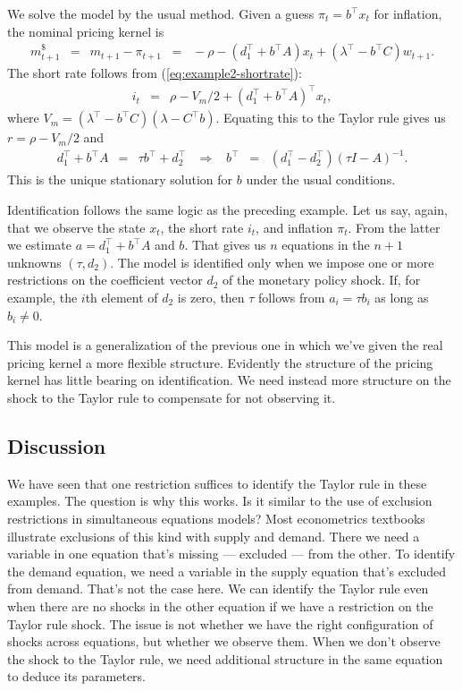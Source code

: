 \documentclass[12pt]{article}
\newcounter{fig}
\begin{document}
{We solve the model by the usual method.
Given a guess $\pi_t = b^\top x_t$ for inflation,
the nominal pricing kernel is
\begin{eqnarray*}
    m^{\$}_{t+1} &=& m_{t+1} - \pi_{t+1}
            \;\;=\;\; - \rho - (d_1^\top + b^\top  A ) x_t + (\lambda^\top - b^\top C) w_{t+1} .
\end{eqnarray*}
The short rate follows from (\ref{eq:example2-shortrate}):
\begin{eqnarray*}
    i_t &=& \rho - V_m/2 + (d_1^\top + b^\top  A )^\top x_t ,
\end{eqnarray*}
where $V_m = (\lambda^\top - b^\top C)(\lambda - C^\top b)$.
Equating this to the Taylor rule gives us
$ r = \rho - V_m/2$ and
\begin{eqnarray*}
    d_1^\top + b^\top  A  &=& \tau b^\top + d_2^\top
    \;\;\;\Rightarrow\;\;\;
    b^\top \;\;=\;\; (d_1^\top - d_2^\top) (\tau I -  A )^{-1} .
\end{eqnarray*}
This is the unique stationary solution for $b$ under the usual conditions.

Identification follows the same logic as the preceding example.
Let us say, again, that we observe the state $x_t$, the short rate $i_t$,
and inflation $\pi_t$.
From the latter we estimate $a = d_1^\top + b^\top A$ and $b$.
That gives us $n$ equations in the $n+1$ unknowns $(\tau, d_2)$.
The model is identified only when we impose one or more
restrictions on the coefficient vector $d_2$ of the monetary policy shock.
If, for example, the $i$th element of $d_2$ is zero,
then $\tau$ follows from $a_i = \tau b_i$ as long as $b_i \neq 0$.

This model is a generalization of the previous one in which we've given
the real pricing kernel a more flexible structure.
Evidently the structure of the pricing kernel has little bearing on identification.
We need instead more structure on the shock to the Taylor rule to compensate
for not observing it.


\subsection{Discussion}
\label{sec:macro-fin-discussion}

We have seen that one restriction suffices to identify the Taylor rule
in these examples.
The question is why this works.
Is it similar to the use of exclusion restrictions in simultaneous equations models?
Most econometrics textbooks illustrate exclusions of this kind with supply and demand.
There we need a variable in one equation that's missing --- excluded ---
from the other.
To identify the demand equation,
we need a variable in the supply equation that's excluded from demand.
That's not the case here.
We can identify the Taylor rule even when there are no shocks in
the other equation if we have a restriction on the Taylor rule shock.
The issue is not whether we have the right
configuration of shocks across equations, but whether we observe them.
When we don't observe the shock to the Taylor rule,
we need additional structure in the same equation to deduce its parameters.

}
\end{document}
